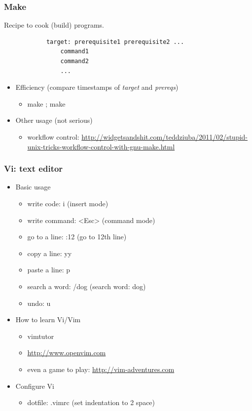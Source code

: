 \documentclass{beamer}
\begin{document}
  \begin{frame}[fragile]
    \frametitle{Make}
    Recipe to cook (build) programs. 
    \begin{verbatim}
			target: prerequisite1 prerequisite2 ...
			    command1
			    command2
			    ...
    \end{verbatim}
		\begin{itemize}
      \item Efficiency (compare timestamps of \textit{target} and \textit{prereqs})
			\begin{itemize}
        \item make ; make
      \end{itemize}
			\item Other usage (not serious)
			\begin{itemize}
        \item workflow control: \textcolor{ExecusharesGrey}{\footnotesize\hspace{1em}\url{http://widgetsandshit.com/teddziuba/2011/02/stupid-unix-tricks-workflow-control-with-gnu-make.html}}
      \end{itemize}						 
    \end{itemize}	
	\end{frame}

	\begin{frame}
		\frametitle{Vi: text editor}
		
		\begin{itemize}
			\item \small Basic usage
			\begin{itemize}
				\item \small write code: i (insert mode)
				\item \small write command: <Esc> (command mode)
				\item \small go to a line: :12 (go to 12th line)
				\item \small copy a line: yy
				\item \small paste a line: p
				\item \small search a word: /dog (search word: dog)
				\item \small undo: u
			\end{itemize} 
      \item \small How to learn Vi/Vim
      \begin{itemize}
        \item \small vimtutor
				\item \small \url{http://www.openvim.com}
				\item \small even a game to play: \url{http://vim-adventures.com}
      \end{itemize}
      \item \small Configure Vi
      \begin{itemize}
				\item \small dotfile: .vimrc (set indentation to 2 space)
			\end{itemize}
    \end{itemize}
  \end{frame}
\end{document}
